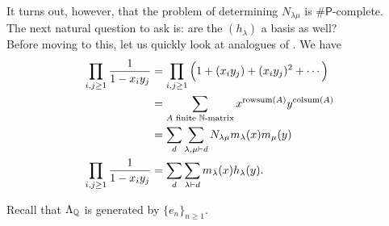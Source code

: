	It turns out, however, that the problem of determining $N_{\lambda\mu}$ is $\#\mathsf{P}$-complete.\\ %
	The next natural question to ask is: are the $(h_\lambda)$ a basis as well?\\
	Before moving to this, let us quickly look at analogues of . We have
	\begin{align}
		\prod_{i,j \ge 1} \frac{1}{1-x_iy_j} &= \prod_{i,j \ge 1} \left(1 + (x_iy_j) + (x_iy_j)^2 + \cdots\right) \nonumber \\
			&= \sum_{\text{$A$ finite $\mathbb{N}$-matrix}} x^{\operatorname{rowsum}(A)} y^{\operatorname{colsum}(A)} \nonumber \\
			&= \sum_d \sum_{\lambda,\mu \vdash d} N_{\lambda\mu} m_\lambda(x) m_\mu(y) \nonumber \\
		\prod_{i,j \ge 1} \frac{1}{1-x_iy_j} &= \sum_d \sum_{\lambda \vdash d} m_\lambda(x) h_\lambda(y). \label{eqn: prod 1 m xi yj}
	\end{align}

	Recall that $\Lambda_{\mathbb{Q}}$ is generated by $\{e_n\}_{n \ge 1}$.

